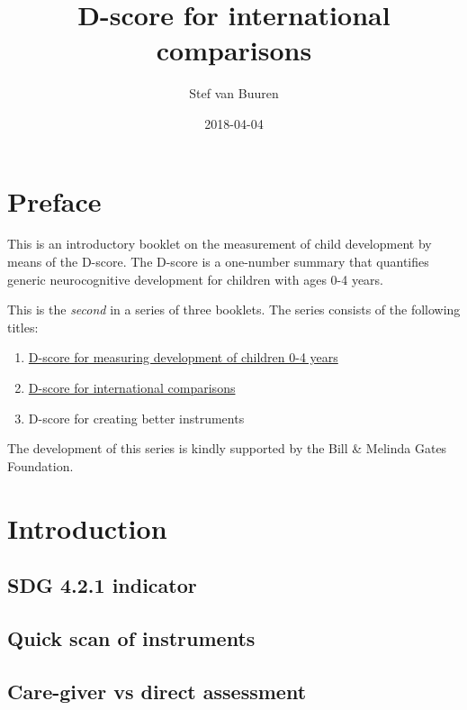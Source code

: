 \documentclass[]{book}
\title{D-score for international comparisons}
\author{Stef van Buuren}
\date{2018-04-04}
\providecommand{\tightlist}{%
  \setlength{\itemsep}{0pt}\setlength{\parskip}{0pt}}
\theoremstyle{definition}
\theoremstyle{definition}
\theoremstyle{definition}
\theoremstyle{remark}
\begin{document}
\maketitle

{
\setcounter{tocdepth}{1}
\tableofcontents
}
\chapter*{Preface}\label{preface}

This is an introductory booklet on the measurement of child development
by means of the D-score. The D-score is a one-number summary that
quantifies generic neurocognitive development for children with ages 0-4
years.

This is the \emph{second} in a series of three booklets. The series
consists of the following titles:

\begin{enumerate}
\def\labelenumi{\arabic{enumi}.}
\tightlist
\item
  \href{https://stefvanbuuren.github.io/dbook1/}{D-score for measuring
  development of children 0-4 years}
\item
  \href{https://stefvanbuuren.github.io/dbook2/}{D-score for
  international comparisons}
\item
  D-score for creating better instruments
\end{enumerate}

The development of this series is kindly supported by the Bill \&
Melinda Gates Foundation.

\chapter{Introduction}\label{ch:introduction2}

\section{SDG 4.2.1 indicator}\label{sdg-4.2.1-indicator}

\section{Quick scan of instruments}\label{quick-scan-of-instruments}

\section{Care-giver vs direct
assessment}\label{care-giver-vs-direct-assessment}
\end{document}
